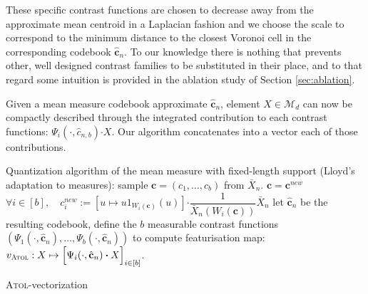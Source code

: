\documentclass[twoside]{article}
\newcommand{\cb}{\mathbf{c}}
\begin{document}
These specific contrast functions are chosen to decrease away from the approximate mean centroid in a Laplacian fashion and we choose the scale to correspond to the minimum distance to the closest Voronoi cell in the corresponding codebook $\hat{\cb}_n$.
To our knowledge there is nothing that prevents other, well designed contrast families to be substituted in their place, and to that regard some intuition is provided in the ablation study of Section \ref{sec:ablation}.

Given a mean measure codebook approximate $\hat{\cb}_n$, element $X \in \mathcal{M}_d$ can now be compactly described through the integrated contribution to each contrast functions: $\Psi_i(\cdot, \hat{c}_{n,b}) \boldsymbol{\cdot} X$. Our algorithm concatenates into a vector each of those contributions.

\begin{algorithm2e} %
	\SetAlgoLined
	  
	Quantization algorithm of the mean measure with fixed-length support (Lloyd's adaptation to measures): sample $\cb = (c_1, \dots, c_b)$ from $\bar{X}_n$. \;
	\While{$\cb^{\textit{new}} = (c_1^{\textit{new}}, \dots, c_b^{\textit{new}}) \neq \cb$}
	{
		$\cb = \cb^{\textit{new}}$ \;
		$\forall i \in [b], \quad
		c^{\textit{new}}_i := \left[ u \mapsto u 1_{W_i(\cb)}(u) \right] \boldsymbol{\cdot} \dfrac{1}{\bar{X}_n (W_i(\cb))} \bar{X}_n$ \;
	}
	let $\hat{\cb}_n$ be the resulting codebook, define the $b$ measurable contrast functions $(\Psi_1(\cdot, \hat{\cb}_n), \dots, \Psi_b(\cdot, \hat{\cb}_n))$ to compute featurisation map: $v_\textsc{Atol}: X \mapsto \Big[ \Psi_i(\cdot, \hat{\cb}_n) \boldsymbol{\cdot} X \Big]_{i \in [b]}$. \;
	\caption{\textsc{Atol}-vectorization}\label{alg:atolfeat}
\end{algorithm2e}

\end{document}
